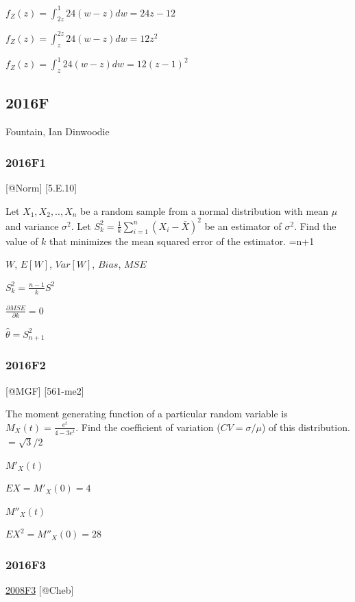 \documentclass[6pt,twocolumn,Portrait]{article}
\begin{document}
 \(f_{Z}(z)=\int_{2z}^{1}24(w-z)dw=24z-12\)

 \(f_{Z}(z)=\int_{z}^{2z}24(w-z)dw=12z^2\)

{ \(f_{Z}(z)=\int_{z}^{1}24(w-z)dw=12(z-1)^2\) }

\hypertarget{f-11}{%
\subsection{2016F}\label{f-11}}

Fountain, Ian Dinwoodie

\hypertarget{f1-6}{%
\subsubsection{2016F1}\label{f1-6}}

{[}@Norm{]} {[}5.E.10{]}

Let \(X_1,X_2,..,X_n\) be a random sample from a normal distribution
with mean \(\mu\) and variance \(\sigma^2\). Let
\(S_k^2=\frac1k\sum_{i=1}^n(X_i-\bar X)^2\) be an estimator of
\(\sigma^2\). Find the value of \(k\) that minimizes the mean squared
error of the estimator. =n+1

\(W\), \(E[W]\), \(Var[W]\), \(Bias\), \(MSE\)

\(S_k^2=\frac{n-1}{k}S^2\)

\(\frac{\partial MSE}{\partial k}=0\)

\(\hat\theta=S_{n+1}^2\)

\hypertarget{f2-6}{%
\subsubsection{2016F2}\label{f2-6}}

{[}@MGF{]} {[}561-me2{]}

The moment generating function of a particular random variable is
\(M_X(t)=\frac{e^t}{4-3e^t}\). Find the coefficient of variation
(\(CV=\sigma/\mu\)) of this distribution. \(=\sqrt3/2\)

\(M'_X(t)\)

\(EX=M'_X(0)=4\)

\(M''_X(t)\)

\(EX^2=M''_X(0)=28\)

\hypertarget{f3-6}{%
\subsubsection{2016F3}\label{f3-6}}

\protect\hyperlink{f3-3}{2008F3} {[}@Cheb{]}
\end{document}
